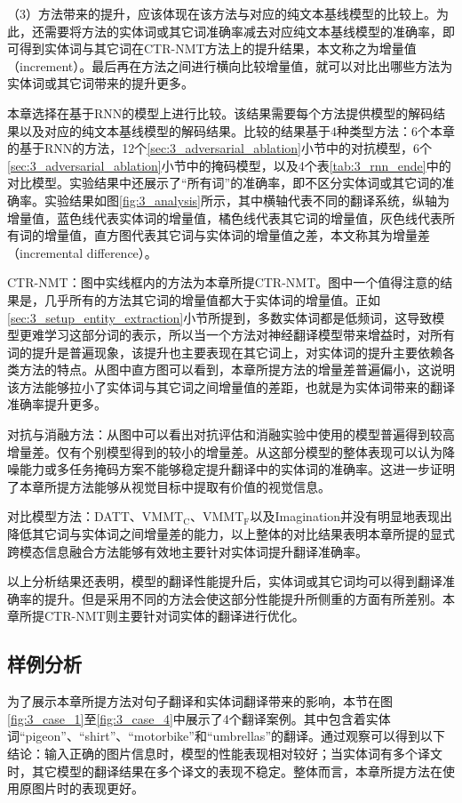 （3）方法带来的提升，应该体现在该方法与对应的纯文本基线模型的比较上。为此，还需要将方法的实体词或其它词准确率减去对应纯文本基线模型的准确率，即可得到实体词与其它词在CTR-NMT方法上的提升结果，本文称之为增量值（increment）。最后再在方法之间进行横向比较增量值，就可以对比出哪些方法为实体词或其它词带来的提升更多。


本章选择在基于RNN的模型上进行比较。该结果需要每个方法提供模型的解码结果以及对应的纯文本基线模型的解码结果。比较的结果基于4种类型方法：6个本章的基于RNN的方法，12个\ref{sec:3_adversarial_ablation}小节中的对抗模型，6个\ref{sec:3_adversarial_ablation}小节中的掩码模型，以及4个表\ref{tab:3_rnn_ende}中的对比模型。实验结果中还展示了“所有词”的准确率，即不区分实体词或其它词的准确率。实验结果如图\ref{fig:3_analysis}所示，其中横轴代表不同的翻译系统，纵轴为增量值，蓝色线代表实体词的增量值，橘色线代表其它词的增量值，灰色线代表所有词的增量值，直方图代表其它词与实体词的增量值之差，本文称其为增量差（incremental difference）。

{\sffamily CTR-NMT：}图中实线框内的方法为本章所提CTR-NMT。图中一个值得注意的结果是，几乎所有的方法其它词的增量值都大于实体词的增量值。正如\ref{sec:3_setup_entity_extraction}小节所提到，多数实体词都是低频词，这导致模型更难学习这部分词的表示，所以当一个方法对神经翻译模型带来增益时，对所有词的提升是普遍现象，该提升也主要表现在其它词上，对实体词的提升主要依赖各类方法的特点。从图中直方图可以看到，本章所提方法的增量差普遍偏小，这说明该方法能够拉小了实体词与其它词之间增量值的差距，也就是为实体词带来的翻译准确率提升更多。

{\sffamily 对抗与消融方法：}从图中可以看出对抗评估和消融实验中使用的模型普遍得到较高增量差。仅有个别模型得到的较小的增量差。从这部分模型的整体表现可以认为降噪能力或多任务掩码方案不能够稳定提升翻译中的实体词的准确率。这进一步证明了本章所提方法能够从视觉目标中提取有价值的视觉信息。

{\sffamily 对比模型方法：}DATT、$ \mathrm{VMMT_C} $、$ \mathrm{VMMT_F} $以及Imagination并没有明显地表现出降低其它词与实体词之间增量差的能力，以上整体的对比结果表明本章所提的显式跨模态信息融合方法能够有效地主要针对实体词提升翻译准确率。

以上分析结果还表明，模型的翻译性能提升后，实体词或其它词均可以得到翻译准确率的提升。但是采用不同的方法会使这部分性能提升所侧重的方面有所差别。本章所提CTR-NMT则主要针对词实体的翻译进行优化。

\subsection{样例分析}
为了展示本章所提方法对句子翻译和实体词翻译带来的影响，本节在图\ref{fig:3_case_1}至\ref{fig:3_case_4}中展示了4个翻译案例。其中包含着实体词“pigeon”、“shirt”、“motorbike”和“umbrellas”的翻译。通过观察可以得到以下结论：输入正确的图片信息时，模型的性能表现相对较好；当实体词有多个译文时，其它模型的翻译结果在多个译文的表现不稳定。整体而言，本章所提方法在使用原图片时的表现更好。




